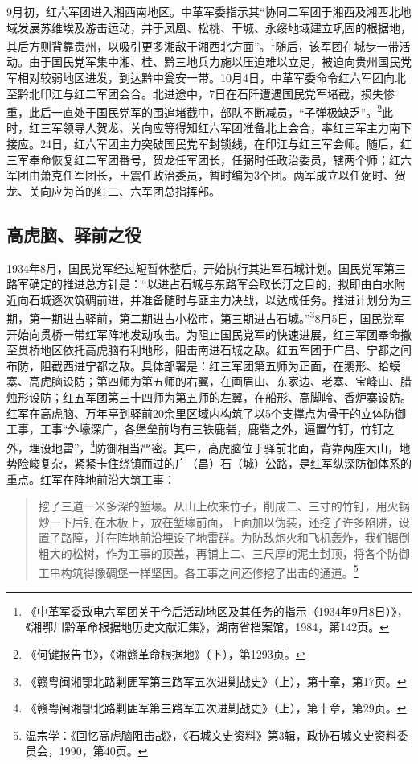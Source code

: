 9月初，红六军团进入湘西南地区。中革军委指示其“协同二军团于湘西及湘西北地域发展苏维埃及游击运动，并于凤凰、松桃、干城、永绥地域建立巩固的根据地，其后方则背靠贵州，以吸引更多湘敌于湘西北方面”。\footnote{《中革军委致电六军团关于今后活动地区及其任务的指示（1934年9月8日）》，《湘鄂川黔革命根据地历史文献汇集》，湖南省档案馆，1984，第142页。}随后，该军团在城步一带活动。由于国民党军集中湘、桂、黔三地兵力施以压迫难以立足，被迫向贵州国民党军相对较弱地区进发，到达黔中瓮安一带。10月4日，中革军委命令红六军团向北至黔北印江与红二军团会合。北进途中，7日在石阡遭遇国民党军堵截，损失惨重，此后一直处于国民党军的围追堵截中，部队不断减员，“子弹极缺乏”。\footnote{《何键报告书》，《湘赣革命根据地》（下），第1293页。}此时，红三军领导人贺龙、关向应等得知红六军团准备北上会合，率红三军主力南下接应。24日，红六军团主力突破国民党军封锁线，在印江与红三军会师。随后，红三军奉命恢复红二军团番号，贺龙任军团长，任弼时任政治委员，辖两个师；红六军团由萧克任军团长，王震任政治委员，暂时编为3个团。两军成立以任弼时、贺龙、关向应为首的红二、六军团总指挥部。

\subsection{高虎脑、驿前之役}


1934年8月，国民党军经过短暂休整后，开始执行其进军石城计划。国民党军第三路军确定的推进总方针是：“以进占石城与东路军会取长汀之目的，拟即由白水附近向石城逐次筑碉前进，并准备随时与匪主力决战，以达成任务。推进计划分为三期，第一期进占驿前，第二期进占小松市，第三期进占石城。”\footnote{《赣粤闽湘鄂北路剿匪军第三路军五次进剿战史》（上），第十章，第17页。}8月5日，国民党军开始向贯桥一带红军阵地发动攻击。为阻止国民党军的快速进展，红三军团奉命撤至贯桥地区依托高虎脑有利地形，阻击南进石城之敌。红五军团于广昌、宁都之间布防，阻截西进宁都之敌。具体部署是：红三军团第五师为正面，在鹅形、蛤蟆寨、高虎脑设防；第四师为第五师的右翼，在画眉山、东家边、老寨、宝峰山、腊烛形设防；红五军团第三十四师为第五师的左翼，在船形、高脚岭、香炉寨设防。红军在高虎脑、万年亭到驿前20余里区域内构筑了以5个支撑点为骨干的立体防御工事，工事“外壕深广，各堡垒前均有三铁鹿砦，鹿砦之外，遍置竹钉，竹钉之外，埋设地雷”，\footnote{《赣粤闽湘鄂北路剿匪军第三路军五次进剿战史》（上），第十章，第29页。}防御相当严密。其中，高虎脑位于驿前北面，背靠两座大山，地势险峻复杂，紧紧卡住绕镇而过的广（昌）石（城）公路，是红军纵深防御体系的重点。红军在阵地前沿大筑工事：

\begin{quote}

挖了三道一米多深的堑壕。从山上砍来竹子，削成二、三寸的竹钉，用火锅炒一下后钉在木板上，放在堑壕前面，上面加以伪装，还挖了许多陷阱，设置了路障，并在阵地前沿埋设了地雷群。为防敌炮火和飞机轰炸，我们锯倒粗大的松树，作为工事的顶盖，再铺上二、三尺厚的泥土封顶，将各个防御工串构筑得像碉堡一样坚固。各工事之间还修挖了出击的通道。\footnote{温宗学：《回忆高虎脑阻击战》，《石城文史资料》第3辑，政协石城文史资料委员会，1990，第40页。}
\end{quote}


